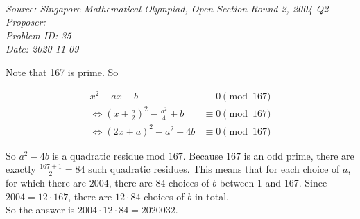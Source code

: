 \SSbreak\\
\emph{Source: Singapore Mathematical Olympiad, Open Section Round 2, 2004 Q2}\\
\emph{Proposer: \Pbrain}\\
\emph{Problem ID: 35}\\
\emph{Date: 2020-11-09}\\
\SSbreak

\bigskip

\begin{solution}\hfil\medskip 

    Note that 167 is prime. So 
    
    \begin{align*}
        x^2 + ax + b &\equiv 0 \pmod{167} \\
        \iff (x + \frac a2)^2 - \frac{a^2}{4} + b &\equiv 0 \pmod{167}\\
        \iff (2x + a)^2 - a^2 + 4b &\equiv 0 \pmod{167}
    \end{align*}

    So $a^2 - 4b$ is a quadratic residue mod $167$. Because $167$ is an odd prime, there are exactly $\frac{167+1}{2}=84$ such quadratic residues. This means that for each choice of $a$, for which there are $2004$, there are $84$ choices of $b$ between 1 and 167. Since $2004 = 12 \cdot 167$, there are $12 \cdot 84$ choices of $b$ in total. \\
    So the answer is $2004 \cdot 12 \cdot 84 = \boxed{2020032}$. 
\end{solution}\bigskip
